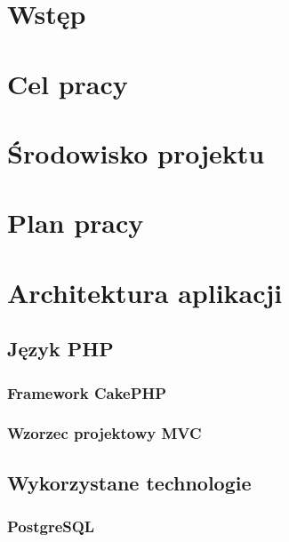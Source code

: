 \documentclass[12pt,twoside,a4paper]{article}
\begin{document}






\newpage
\section*{Wstęp}
	

\newpage
\section{Cel pracy}
	
	
\newpage	
\section{Środowisko projektu}
	

\newpage		
\section{Plan pracy}
	
	
	

\newpage
\section{Architektura aplikacji}
	
	\subsection{Język PHP}
		
		\subsubsection{Framework CakePHP}
		\subsubsection{Wzorzec projektowy MVC}
	
	\subsection{Wykorzystane technologie}
		\subsubsection{PostgreSQL}
			
\end{document}
